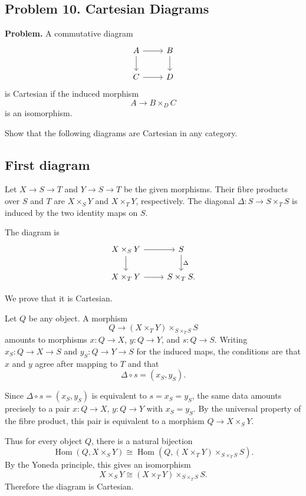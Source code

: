 
\subsection*{Problem 10. Cartesian Diagrams}

\textbf{Problem.}
A commutative diagram
\[
\begin{tikzcd}
	A \arrow[r] \arrow[d] & B \arrow[d] \\
	C \arrow[r] & D
\end{tikzcd}
\]
is Cartesian if the induced morphism
\[
A\longrightarrow B\times_D C
\]
is an isomorphism.

Show that the following diagrams are Cartesian in any category.

\subsection{First diagram}

Let \(X\to S\to T\) and \(Y\to S\to T\) be the given morphisms. Their fibre products over \(S\) and \(T\) are \(X\times_S Y\) and \(X\times_T Y\), respectively. The diagonal \(\Delta:S\to S\times_T S\) is induced by the two identity maps on \(S\).

The diagram is
\[
\begin{tikzcd}
	X\times_S Y \arrow[r] \arrow[d]
	&
	S \arrow[d,"\Delta"]
	\\
	X\times_T Y \arrow[r]
	&
	S\times_T S.
\end{tikzcd}
\]

We prove that it is Cartesian.

Let \(Q\) be any object. A morphism
\[
Q\longrightarrow
(X\times_T Y)\times_{S\times_T S}S
\]
amounts to morphisms \(x:Q\to X\), \(y:Q\to Y\), and \(s:Q\to S\). Writing \(x_S:Q\to X\to S\) and \(y_S:Q\to Y\to S\) for the induced maps, the conditions are that \(x\) and \(y\) agree after mapping to \(T\) and that
\[
\Delta\circ s=(x_S,y_S).
\]

Since \(\Delta\circ s=(x_S,y_S)\) is equivalent to \(s=x_S=y_S\), the same data amounts precisely to a pair \(x:Q\to X\), \(y:Q\to Y\) with \(x_S=y_S\).
By the universal property of the fibre product, this pair is equivalent to a morphism \(Q\to X\times_S Y\).

Thus for every object \(Q\), there is a natural bijection
\[
\operatorname{Hom}
\left(Q,X\times_S Y\right)
\cong
\operatorname{Hom}
\left(
Q,(X\times_T Y)\times_{S\times_T S}S
\right).
\]
By the Yoneda principle, this gives an isomorphism
\[
X\times_S Y
\cong
(X\times_T Y)\times_{S\times_T S}S.
\]
Therefore the diagram is Cartesian.


